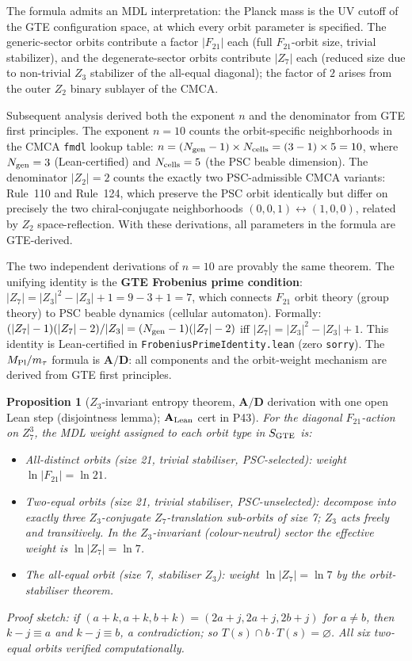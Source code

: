 \documentclass[11pt]{article}
\newtheorem{proposition}[theorem]{Proposition}
\theoremstyle{remark}
\newcommand{\lean}[1]{%
  \penalty-100
  \begingroup\def\_{\textunderscore\allowbreak}\texttt{#1}\endgroup}
\newcommand{\CatAL}{\ensuremath{\textbf{A}_{\rm Lean}}}
\newcommand{\CatAD}{\textbf{A/D}}
\begin{document}
The formula admits an MDL interpretation: the Planck mass is the UV cutoff of the
GTE configuration space, at which every orbit parameter is specified.
The generic-sector orbits contribute a factor $|F_{21}|$ each (full $F_{21}$-orbit
size, trivial stabilizer), and the degenerate-sector orbits contribute $|Z_7|$ each
(reduced size due to non-trivial $Z_3$ stabilizer of the all-equal diagonal);
the factor of $2$ arises from the outer $Z_2$ binary sublayer of the CMCA.

Subsequent analysis derived both the exponent $n$ and the denominator from GTE
first principles.
The exponent $n=10$ counts the orbit-specific neighborhoods in the CMCA \texttt{fmdl}
lookup table:
$n = (N_{\rm gen}-1)\times N_{\rm cells} = (3-1)\times 5 = 10$,
where $N_{\rm gen}=3$ (Lean-certified) and $N_{\rm cells}=5$ (the PSC
beable dimension).
The denominator $|Z_2|=2$ counts the exactly two PSC-admissible CMCA variants:
Rule~110 and Rule~124, which preserve the PSC orbit identically but differ on
precisely the two chiral-conjugate neighborhoods
$(0,0,1)\leftrightarrow(1,0,0)$, related by $Z_2$ space-reflection.
With these derivations, all parameters in the formula are GTE-derived.

The two independent derivations of $n=10$ are provably the same theorem.
The unifying identity is the \textbf{GTE Frobenius prime condition}:
$|Z_7| = |Z_3|^2 - |Z_3| + 1 = 9 - 3 + 1 = 7$,
which connects $F_{21}$ orbit theory (group theory) to PSC beable dynamics
(cellular automaton).
Formally: $(|Z_7|-1)(|Z_7|-2)/|Z_3| = (N_{\rm gen}-1)(|Z_7|-2)$ iff
$|Z_7| = |Z_3|^2-|Z_3|+1$.
This identity is Lean-certified in \lean{FrobeniusPrimeIdentity.lean}
(zero \texttt{sorry}).
The $M_{\rm Pl}/m_\tau$ formula is $\CatAD$: all components and the
orbit-weight mechanism are derived from GTE first principles.

\begin{proposition}[$Z_3$-invariant entropy theorem, $\CatAD$ derivation with one open Lean step (disjointness lemma); $\CatAL$ cert in P43]
\label{prop:orbit_weight}
For the diagonal $F_{21}$-action on $Z_7^3$, the MDL weight assigned to each
orbit type in $S_{\rm GTE}$ is:
\begin{itemize}[noitemsep]
\item \emph{All-distinct orbits} (size 21, trivial stabiliser, PSC-selected):
  weight $\ln|F_{21}| = \ln 21$.
\item \emph{Two-equal orbits} (size 21, trivial stabiliser, PSC-unselected):
  decompose into exactly three $Z_3$-conjugate $Z_7$-translation sub-orbits
  of size 7; $Z_3$ acts freely and transitively.  In the $Z_3$-invariant
  (colour-neutral) sector the effective weight is $\ln|Z_7| = \ln 7$.
\item \emph{The all-equal orbit} (size 7, stabiliser $Z_3$): weight
  $\ln|Z_7| = \ln 7$ by the orbit-stabiliser theorem.
\end{itemize}
\emph{Proof sketch:} if $(a+k,a+k,b+k)=(2a+j,2a+j,2b+j)$ for $a\neq b$, then
$k-j\equiv a$ and $k-j\equiv b$, a contradiction; so $T(s)\cap b\cdot T(s)=\varnothing$.
All six two-equal orbits verified computationally.
\end{proposition}
\end{document}
